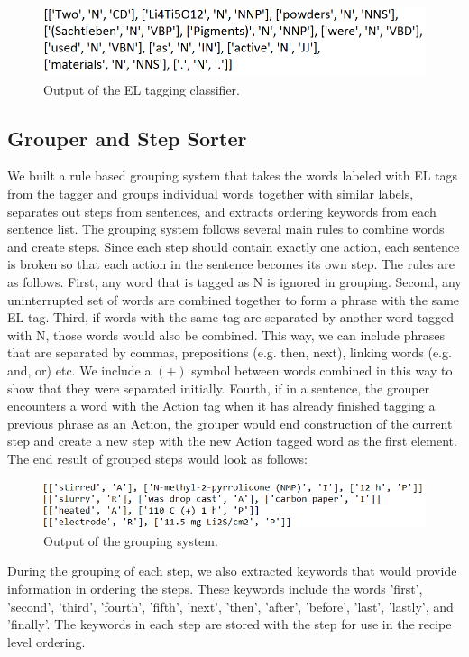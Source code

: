 \begin{figure}
  \centering
    \includegraphics[width=.5\textwidth]{taggerout.png}
  \caption{Output of the EL tagging classifier.}
\end{figure}

\subsection{Grouper and Step Sorter}

We built a rule based grouping system that takes the words labeled with EL tags from the tagger and groups individual words together with similar labels, separates out steps from sentences, and extracts ordering keywords from each sentence list. The grouping system follows several main rules to combine words and create steps. Since each step should contain exactly one action, each sentence is broken so that each action in the sentence becomes its own step. The rules are as follows. First, any word that is tagged as N is ignored in grouping. Second, any uninterrupted set of words are combined together to form a phrase with the same EL tag. Third, if words with the same tag are separated by another word tagged with N, those words would also be combined. This way, we can include phrases that are separated by commas, prepositions (e.g. then, next), linking words (e.g. and, or) etc. We include a $(+)$ symbol between words combined in this way to show that they were separated initially. Fourth, if in a sentence, the grouper encounters a word with the Action tag when it has already finished tagging a previous phrase as an Action, the grouper would end construction of the current step and create a new step with the new Action tagged word as the first element. The end result of grouped steps would look as follows:

\begin{figure}
  \centering
    \includegraphics[width=.5\textwidth]{grouperout.png}
  \caption{Output of the grouping system.}
\end{figure}

During the grouping of each step, we also extracted keywords that would provide information in ordering the steps. These keywords include the words 'first', 'second', 'third', 'fourth', 'fifth', 'next', 'then', 'after', 'before', 'last', 'lastly', and 'finally'. The keywords in each step are stored with the step for use in the recipe level ordering. 

